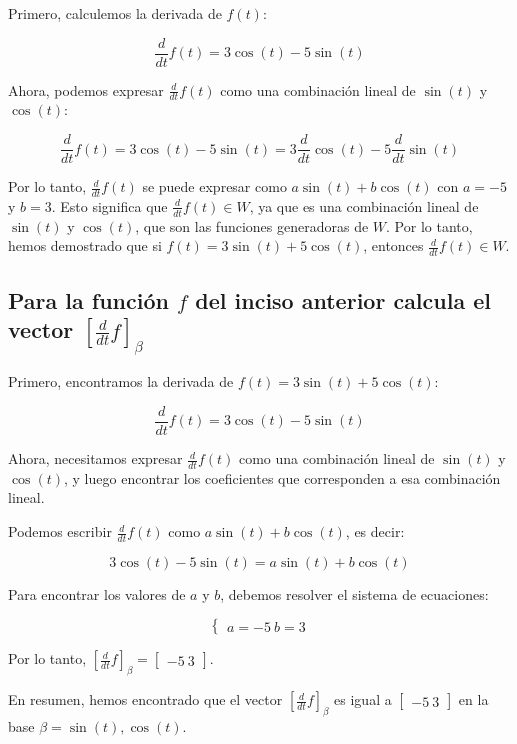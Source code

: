 Primero, calculemos la derivada de $f(t)$:

$$\frac{d}{dt}f(t) = 3\cos(t) - 5\sin(t)$$

Ahora, podemos expresar $\frac{d}{dt}f(t)$ como una combinación lineal de $\sin(t)$ y $\cos(t)$:

$$\frac{d}{dt}f(t) = 3\cos(t) - 5\sin(t) = 3\frac{d}{dt}\cos(t) - 5\frac{d}{dt}\sin(t)$$

Por lo tanto, $\frac{d}{dt}f(t)$ se puede expresar como $a\sin(t) + b\cos(t)$ con $a=-5$ y $b=3$. 
Esto significa que $\frac{d}{dt}f(t) \in W$, ya que es una combinación lineal de $\sin(t)$ y $\cos(t)$, 
que son las funciones generadoras de $W$. Por lo tanto, hemos demostrado que si $f(t) = 3\sin(t) + 5\cos(t)$, 
entonces $\frac{d}{dt}f(t) \in W$.

\subsection{Para la función $f$ del inciso anterior calcula el vector $[\frac{d}{dt}f]_\beta$}

Primero, encontramos la derivada de $f(t) = 3\sin(t) + 5\cos(t)$:

$$\frac{d}{dt}f(t) = 3\cos(t) - 5\sin(t)$$

Ahora, necesitamos expresar $\frac{d}{dt}f(t)$ como una combinación lineal de $\sin(t)$ y $\cos(t)$, y 
luego encontrar los coeficientes que corresponden a esa combinación lineal.

Podemos escribir $\frac{d}{dt}f(t)$ como $a\sin(t) + b\cos(t)$, es decir:

$$3\cos(t) - 5\sin(t) = a\sin(t) + b\cos(t)$$

Para encontrar los valores de $a$ y $b$, debemos resolver el sistema de ecuaciones:

$$\begin{cases} a = -5\ b = 3\end{cases}$$

Por lo tanto, $[\frac{d}{dt}f]_\beta = \begin{bmatrix} -5 \ 3 \end{bmatrix}$.

En resumen, hemos encontrado que el vector $[\frac{d}{dt}f]_\beta$ es igual a $\begin{bmatrix} -5 \ 3 \end{bmatrix}$ en la base $\beta = {\sin(t), \cos(t)}$.

